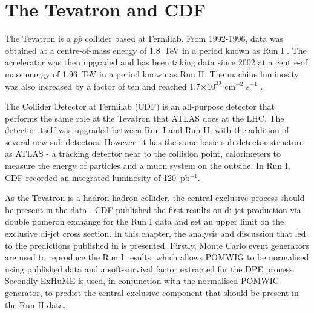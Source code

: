 \section{The Tevatron and CDF}

The Tevatron is a $p\bar{p}$ collider based at Fermilab. From 1992-1996, data was obtained at a centre-of-mass energy of 1.8~TeV in a period known as Run I \cite{Zhou:2002uy}. The accelerator was then upgraded and has been taking data since 2002 at a centre-of mass energy of 1.96~TeV in a period known as Run II. The machine luminosity was also increased by a factor of ten and reached 1.7$\times10^{32}$ cm$^{-2}$ s$^{-1}$ \cite{Sonnenschein:2006bz}. 

The Collider Detector at Fermilab (CDF) \cite{Blair:1996kx} is an all-purpose detector that performs the same role at the Tevatron that ATLAS does at the LHC. The detector itself was upgraded between Run I and Run II, with the addition of several new sub-detectors. However, it has the same basic sub-detector structure as ATLAS - a tracking detector near to the collision point, calorimeters to measure the energy of particles and a muon system on the outside. In Run I, CDF recorded an integrated luminosity of 120~pb$^{-1}$. 

As the Tevatron is a hadron-hadron collider, the central exclusive process should be present in the data \cite{Khoze:2005ie}.  CDF published the first results on di-jet production via double pomeron exchange \cite{Affolder:2000hd} for the Run I data and set an upper limit on the exclusive di-jet cross section. In this chapter, the analysis and discussion that led to the predictions published in \cite{Cox:2005gr} is presented. Firstly, Monte Carlo event generators are used to reproduce the Run I results, which allows POMWIG to be normalised using published data and a soft-survival factor extracted for the DPE process. Secondly ExHuME  is used, in conjunction with the normalised POMWIG generator, to predict the central exclusive component that should be present in the Run II data. 

